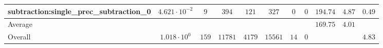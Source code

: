 \begin{tabular}{|l|c|c|c|c|c|c|c|c|c|c|}
subtraction:single\_prec\_subtraction\_0         & $ 4.621 \cdot 10^{-2} $ & $ 9      $ & $ 394   $ & $ 121  $ & $ 327   $ & $ 0  $ & $ 0 $ & $ 194.74      $ & $ 4.87    $ & $ 0.49    $ \\
\hline
Average                                          & $                     $ & $        $ & $       $ & $      $ & $       $ & $    $ & $   $ & $ 169.75      $ & $ 4.01    $ & $         $ \\
\hline
Overall                                          & $ 1.018 \cdot 10^{0}  $ & $ 159    $ & $ 11781 $ & $ 4179 $ & $ 15561 $ & $ 14 $ & $ 0 $ & $             $ & $         $ & $ 4.83    $ \\
\hline
\end{tabular}
